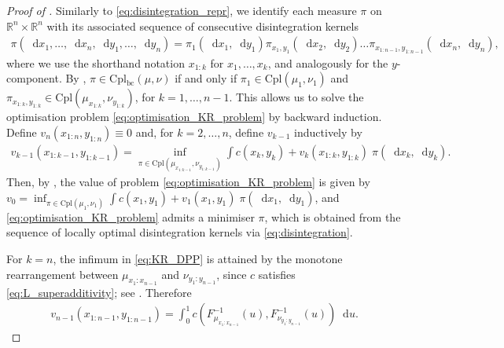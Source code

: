 \documentclass[oneside]{amsart}
\theoremstyle{definition}
\newcommand{\R}{\mathbb R}
\newcommand{\dx}{\mathop{}\!\mathrm{d}x}
\newcommand{\dy}{\mathop{}\!\mathrm{d}y}
\newcommand{\di}{\mathop{}\!\mathrm{d}}
\def\R{{\mathbb R}}
\numberwithin{equation}{section}
\begin{document}
\begin{proof}[Proof of ]
	Similarly to \eqref{eq:disintegration_repr}, we identify each measure $\pi$ on $\R^n\times\R^n$ with its associated sequence of consecutive disintegration kernels
	\begin{align}\label{eq:disintegration}
\pi(\dx_1,\dots,\dx_n,\dy_1,\dots,\dy_n)
	=\pi_1(\dx_1,\dy_1)\pi_{x_1,y_1}(\dx_2,\dy_2)\dots
	\pi_{x_{1:n-1},y_{1:n-1}}
	(\dx_n,\dy_n),
		\end{align}
	where we use the shorthand notation $x_{1:k}$ for $x_1,\dots,x_k$, and analogously for the $y$-component. 
	By \cite[Proposition~5.1]{BaBeLiZa17}, $\pi\in\mathrm{Cpl_{bc}}(\mu,\nu)$ if and only if $\pi_1\in\mathrm{Cpl}(\mu_1,\nu_1)$ and $\pi_{x_{1:k},y_{1:k}}\in\mathrm{Cpl}(\mu_{x_{1:k}},\nu_{y_{1:k}})$, for $k=1,\dots,n-1$. 
	This allows us to solve the optimisation problem \eqref{eq:optimisation_KR_problem} by backward induction. Define $v_n(x_{1:n},y_{1:n})\equiv 0$ and, for $k=2,\dots,n$, define $v_{k-1}$ inductively by
\begin{align}\label{eq:KR_DPP}
v_{k-1}\!\left(x_{1:k-1},y_{1:k-1}\right)
=
\inf_{\pi\in\mathrm{Cpl}(\mu_{x_{1:k-1}},\nu_{y_{1:k-1}})}\int c(x_k,y_k)+v_{k}(x_{1:k},y_{1:k})\;\pi(\dx_k,\dy_k).
\end{align}
Then, by \cite[Proposition~5.2]{BaBeLiZa17}, the value of problem \eqref{eq:optimisation_KR_problem} is given by 
$v_0=
\inf_{\pi\in\mathrm{Cpl}(\mu_1,\nu_1)}\int c(x_1,y_1)+v_1(x_1,y_1)\;\pi(\dx_1,\dy_1)$,
and \eqref{eq:optimisation_KR_problem} admits a minimiser $\pi$, which is obtained from the sequence of locally optimal disintegration kernels via \eqref{eq:disintegration}. 

For $k=n$, the infimum in \eqref{eq:KR_DPP} is attained by the monotone rearrangement between $\mu_{x_1:x_{n-1}}$ and $\nu_{y_1:y_{n-1}}$, since $c$ satisfies \eqref{eq:L_superadditivity}; see . Therefore
\begin{align}
v_{n-1}(x_{1:n-1},y_{1:n-1})
=
\int_0^1 c\!\left(F^{-1}_{\mu_{x_1:x_{n-1}}}(u),F^{-1}_{\nu_{y_1:y_{n-1}}}(u)\right)\di u.
\end{align}


\end{proof}
\end{document}
